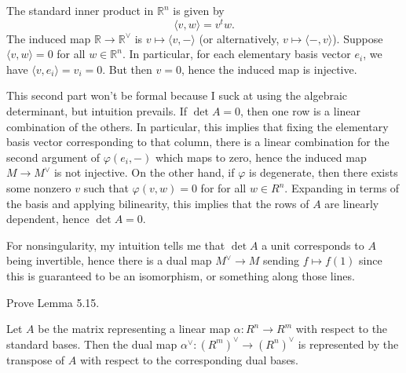 \documentclass[../../master.tex]{subfiles}
\begin{document}
\begin{solution}
    The standard inner product in $\mathbb{R}^{n}$ is given by
    \[
        \langle v, w \rangle = v^{t} w.
    \]
    The induced map $\mathbb{R} \to \mathbb{R}^{\vee}$ is $v \mapsto \langle v, - \rangle$ (or alternatively, $v \mapsto \langle -, v \rangle$).
    Suppose $\langle v, w \rangle = 0$ for all $w \in \mathbb{R}^{n}$.
    In particular, for each elementary basis vector $e_i$, we have $\langle v, e_i \rangle = v_i = 0$.
    But then $v = 0$, hence the induced map is injective.

    This second part won't be formal because I suck at using the algebraic determinant, but intuition prevails.
    If $\det A = 0$, then one row is a linear combination of the others.
    In particular, this implies that fixing the elementary basis vector corresponding to that column, there is a linear combination for the second argument of $\varphi(e_i, -)$ which maps to zero, hence the induced map $M \to M^{\vee}$ is not injective.
    On the other hand, if $\varphi$ is degenerate, then there exists some nonzero $v$ such that $\varphi(v, w) = 0$ for for all $w \in R^{n}$.
    Expanding in terms of the basis and applying bilinearity, this implies that the rows of $A$ are linearly dependent, hence $\det A = 0$.

    For nonsingularity, my intuition tells me that $\det A$ a unit corresponds to $A$ being invertible, hence there is a dual map $M^{\vee} \to M$ sending $f \mapsto f(1)$ since this is guaranteed to be an isomorphism, or something along those lines.
\end{solution}

\begin{problem}
    Prove Lemma 5.15.
    \begin{proposition}[Lemma 5.15] 
        Let $A$ be the matrix representing a linear map $\alpha : R^{n} \to R^{m}$ with respect to the standard bases.
        Then the dual map $\alpha^{\vee} : (R^{m})^{\vee} \to (R^{n})^{\vee}$ is represented by the transpose of $A$ with respect to the corresponding dual bases.
    \end{proposition}
\end{problem}
\end{document}
